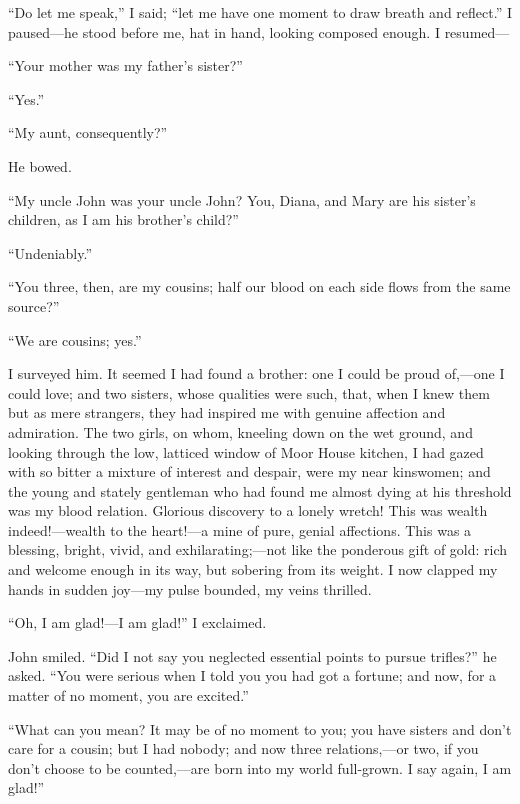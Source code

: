 \enquote{Do let me speak,} I said; \enquote{let me have one moment to
draw breath and reflect.} I paused---he stood before me, hat in hand,
looking composed enough. I resumed---

\enquote{Your mother was my father's sister?}

\enquote{Yes.}

\enquote{My aunt, consequently?}

He bowed.

\enquote{My uncle John was your uncle John? You, Diana, and Mary are
his sister's children, as I am his brother's child?}

\enquote{Undeniably.}

\enquote{You three, then, are my cousins; half our blood on each side
flows from the same source?}

\enquote{We are cousins; yes.}

I surveyed him. It seemed I had found a brother: one I could be proud
of,---one I could love; and two sisters, whose qualities were such,
that, when I knew them but as mere strangers, they had inspired me with
genuine affection and admiration. The two girls, on whom, kneeling down
on the wet ground, and looking through the low, latticed window of Moor
House kitchen, I had gazed with so bitter a mixture of interest and
despair, were my near kinswomen; and the young and stately gentleman who
had found me almost dying at his threshold was my blood relation. 
Glorious discovery to a lonely wretch! This was wealth indeed!---wealth
to the heart!---a mine of pure, genial affections. This was a blessing,
bright, vivid, and exhilarating;---not like the ponderous gift of gold:
rich and welcome enough in its way, but sobering from its weight. I now
clapped my hands in sudden joy---my pulse bounded, my veins thrilled.

\enquote{Oh, I am glad!---I am glad!} I exclaimed.

\St{} John smiled. \enquote{Did I not say you neglected essential points
to pursue trifles?} he asked. \enquote{You were serious when I told you
you had got a fortune; and now, for a matter of no moment, you are
excited.}

\enquote{What can you mean? It may be of no moment to you; you have
sisters and don't care for a cousin; but I had nobody; and now three
relations,---or two, if you don't choose to be counted,---are born into
my world full-grown. I say again, I am glad!}

